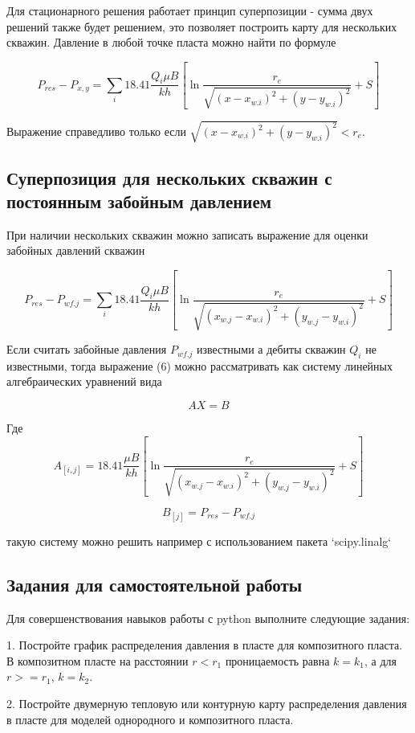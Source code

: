\documentclass[oneside, openany]{memoir}
\begin{document}
	Для стационарного решения работает принцип суперпозиции - сумма двух решений также будет решением, это позволяет построить карту для нескольких скважин.
	Давление в любой точке пласта можно найти по формуле
	
	\begin{equation}
	P_{res} - P_{x,y} =  \sum_{i} 18.41\dfrac{ Q_i\mu B }{kh} \left[ \ln\frac{r_e}{\sqrt{ (x-x_{w.i})^2 + (y-y_{w.i})^2 }} +S \right]
	\end{equation}
	
	Выражение справедливо только если $\sqrt{ (x-x_{w.i})^2 + (y-y_{w.i})^2 }< r_e$.
	
	\subsection{Суперпозиция для нескольких скважин с постоянным забойным давлением}
	
	При наличии нескольких скважин можно записать выражение для оценки забойных давлений скважин
	
	
	$$
	P_{res} - P_{wf.j} =  \sum_{i} 18.41\dfrac{ Q_i\mu B }{kh} \left[ \ln\dfrac{r_e}{\sqrt{ (x_{w.j}-x_{w.i})^2 + (y_{w.j}-y_{w.i})^2 }} +S \right]
	$$
	
	Если считать забойные давления $P_{wf.j}$ известными а дебиты скважин $Q_i$ не известными, тогда выражение (6) можно рассматривать как систему линейных алгебраических уравнений вида
	
	$$AX = B$$
	
	Где
	$$
	A_{[i,j]} = 18.41\dfrac{ \mu B }{kh} \left[ \ln\dfrac{r_e}{\sqrt{ (x_{w.j}-x_{w.i})^2 + (y_{w.j}-y_{w.i})^2 }} +S \right]
	$$
	
	$$
	B_{[j]}=P_{res} - P_{wf.j}
	$$
	
	такую систему можно решить например с использованием пакета `scipy.linalg` 
	
	\subsection{Задания для самостоятельной работы}
	
	Для совершенствования навыков работы с python выполните следующие задания:
	
	1. Постройте график распределения давления в пласте для композитного пласта. В композитном пласте на расстоянии $r<r_1$ проницаемость равна $k=k_1$, а для $r>=r_1$, $k=k_2$. 
	
	2. Постройте двумерную тепловую или контурную карту распределения давления в пласте для моделей однородного и композитного пласта.
	
\end{document}
